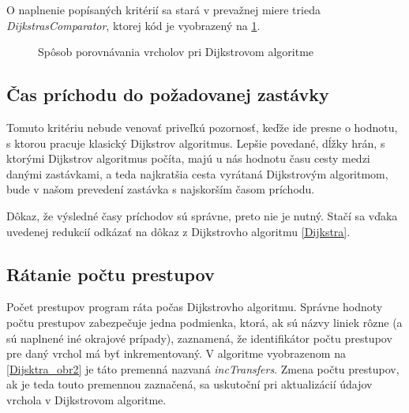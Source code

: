 O naplnenie popísaných kritérií sa stará v prevažnej miere trieda \textit{DijkstrasComparator}, ktorej kód je vyobrazený na \ref{DijsktrasCmp}.

\begin{figure}[H]
  \caption{Spôsob porovnávania vrcholov pri Dijkstrovom algoritme}
  \label{DijsktrasCmp}
\end{figure}


\subsection{Čas príchodu do požadovanej zastávky}

Tomuto kritériu nebude venovať priveľkú pozornosť, keďže ide presne o hodnotu, s ktorou pracuje klasický Dijkstrov algoritmus. Lepšie povedané, dĺžky hrán, s ktorými Dijkstrov algoritmus počíta, majú u nás hodnotu času cesty medzi danými zastávkami, a teda najkratšia cesta vyrátaná Dijkstrovým algoritmom, bude v našom prevedení zastávka s najskorším časom príchodu.\newline

Dôkaz, že výsledné časy príchodov sú správne, preto nie je nutný. Stačí sa vďaka uvedenej redukcií odkázať na dôkaz z Dijkstrovho algoritmu \ref{Dijkstra}.\newline

\subsection{Rátanie počtu prestupov}

Počet prestupov program ráta počas Dijkstrovho algoritmu. Správne hodnoty počtu prestupov zabezpečuje jedna podmienka, ktorá, ak sú názvy liniek rôzne (a sú naplnené iné okrajové prípady), zaznamená, že identifikátor počtu prestupov pre daný vrchol má byť inkrementovaný. V algoritme vyobrazenom na \ref{Dijsktra_obr2} je táto premenná nazvaná \textit{incTransfers}. Zmena počtu prestupov, ak je teda touto premennou zaznačená, sa uskutoční pri aktualizácií údajov vrchola v Dijkstrovom algoritme.\newline

